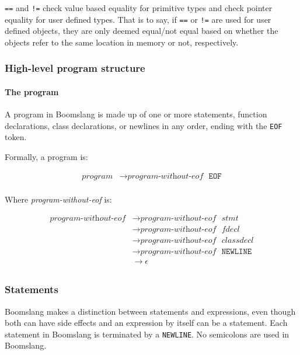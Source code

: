 \documentclass{article}
\begin{document}
\texttt{==} and \texttt{!=} check value based equality for primitive types and check pointer equality for user defined types. That is to say, if \texttt{==} or \texttt{!=} are used for user defined objects, they are only deemed equal/not equal based on whether the objects refer to the same location in memory or not, respectively.

\subsubsection{High-level program structure}
\paragraph{The program}
A program in Boomslang is made up of one or more statements, function declarations, class declarations, or newlines in any order, ending with the \texttt{EOF} token.

Formally, a program is:

\label{sec:program}
\begin{align*}
    \textit{program} &\to \hyperref[sec:program-without-eof]{\textit{program-without-eof}} \texttt{ } \texttt{EOF} \\
\end{align*}

Where \textit{program-without-eof} is:

\label{sec:program-without-eof}
\begin{align*}
    \textit{program-without-eof} &\to \hyperref[sec:program-without-eof]{\textit{program-without-eof}} \texttt{ } \hyperref[sec:stmt]{\textit{stmt}} \\
    &\to \hyperref[sec:program-without-eof]{\textit{program-without-eof}} \texttt{ } \hyperref[sec:fdecl]{\textit{fdecl}} \\
    &\to \hyperref[sec:program-without-eof]{\textit{program-without-eof}} \texttt{ } \hyperref[sec:classdecl]{\textit{classdecl}} \\
    &\to \hyperref[sec:program-without-eof]{\textit{program-without-eof}} \texttt{ } \texttt{NEWLINE} \\
    &\to \epsilon \\
\end{align*}

\subsubsection{Statements}
Boomslang makes a distinction between statements and expressions, even though both can have side effects and an expression by itself can be a statement. Each statement in Boomslang is terminated by a \texttt{NEWLINE}. No semicolons are used in Boomslang.
\end{document}
